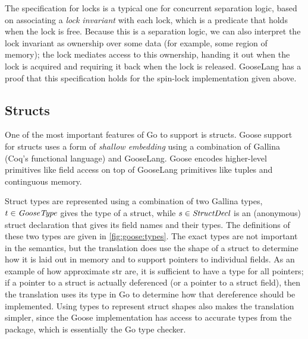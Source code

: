 The specification for locks is a typical one for concurrent separation logic,
based on associating a \emph{lock invariant} with each lock, which is a predicate that holds when the lock
is free. Because this is a separation logic, we can also interpret the lock
invariant as ownership over some data (for example, some region of memory); the
lock mediates access to this ownership, handing it out when the lock is acquired
and requiring it back when the lock is released. GooseLang has a proof that this
specification holds for the spin-lock implementation given above.

\subsection{Structs}


One of the most important features of Go to support is structs. Goose support
for structs uses a form of \emph{shallow embedding} using a combination of
Gallina (Coq's functional language) and GooseLang. Goose encodes
higher-level primitives like field access on top of GooseLang primitives like
tuples and continguous memory.

Struct types are represented using a combination of two Gallina types,
$t \in \textit{GooseType}$ gives the type of a struct, while
$s \in \textit{StructDecl}$ is an (anonymous) struct declaration that gives its
field names and their types. The definitions of these two types are given in
\cref{fig:goose:types}. The exact types are not important in the semantics,
but the translation does use the shape of a struct to determine how it is laid
out in memory and to support pointers to individual fields. As an example of how
approximate str are, it is sufficient to have a  type for
all pointers; if a pointer to a struct is actually deferenced (or a pointer to a
struct field), then the translation uses its type in Go to determine how that
dereference should be implemented. Using types to represent struct shapes
also makes the translation simpler, since the Goose implementation has
access to accurate types from the  package, which is essentially
the Go type checker.

